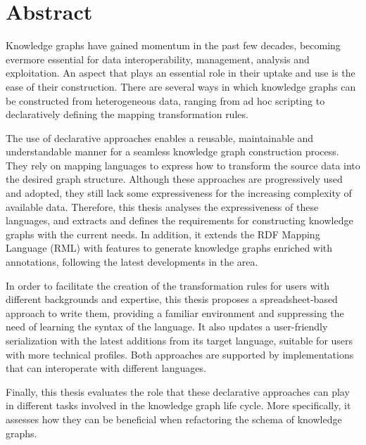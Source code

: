 %

\section*{Abstract}
\label{sec::abstract}




Knowledge graphs have gained momentum in the past few decades, becoming evermore essential for data interoperability, management, analysis and exploitation. 
An aspect that plays an essential role in their uptake and use is the ease of their construction. 
There are several ways in which knowledge graphs can be constructed from heterogeneous data, ranging from ad hoc scripting to declaratively defining the mapping transformation rules.

The use of declarative approaches enables a reusable, maintainable and understandable manner for a seamless knowledge graph construction process.
They rely on mapping languages to express how to transform the source data into the desired graph structure. 
Although these approaches are progressively used and adopted, they still lack some expressiveness for the increasing complexity of available data. 
Therefore, this thesis analyses the expressiveness of these languages, and extracts and defines the requirements for constructing knowledge graphs with the current needs. 
In addition, it extends the RDF Mapping Language (RML) with features to generate knowledge graphs enriched with annotations, following the latest developments in the area.

In order to facilitate the creation of the transformation rules for users with different backgrounds and expertise, this thesis proposes a spreadsheet-based approach to write them, providing a familiar environment and suppressing the need of learning the syntax of the language.
It also updates a user-friendly serialization with the latest additions from its target language, suitable for users with more technical profiles. 
Both approaches are supported by implementations that can interoperate with different languages. 

Finally, this thesis evaluates the role that these declarative approaches can play in different tasks involved in the knowledge graph life cycle. 
More specifically, it assesses how they can be beneficial when refactoring the schema of knowledge graphs. 

